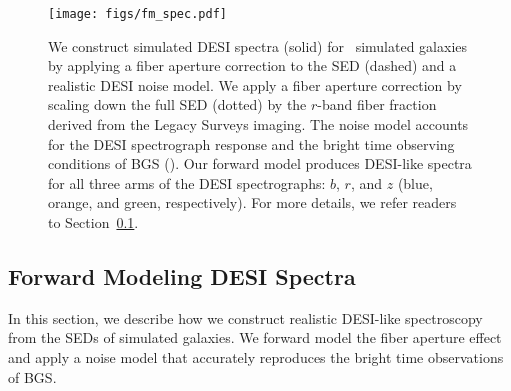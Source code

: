 \begin{figure}
\begin{center}
\texttt{[image: figs/fm\_spec.pdf]}
\caption{
    We construct simulated DESI spectra (solid) for \lgal~simulated galaxies by
    applying a fiber aperture correction to the SED (dashed) and a realistic
    DESI noise model. 
    We apply a fiber aperture correction by scaling down the full SED (dotted)
    by the $r$-band fiber fraction derived from the Legacy Surveys imaging. 
    The noise model accounts for the DESI spectrograph response and the bright
    time observing conditions of BGS ().  
    Our forward model produces DESI-like spectra for all three arms of the DESI
    spectrographs: $b$, $r$, and $z$ (blue, orange, and green, respectively). 
    For more details, we refer readers to Section~\ref{sec:spec}.
    } \label{fig:spec}
\end{center}
\end{figure}

\subsection{Forward Modeling DESI Spectra} \label{sec:spec}
In this section, we describe how we construct realistic DESI-like spectroscopy 
from the SEDs of simulated galaxies. 
We forward model the fiber aperture effect and apply a noise model that
accurately reproduces the bright time observations of BGS. 

